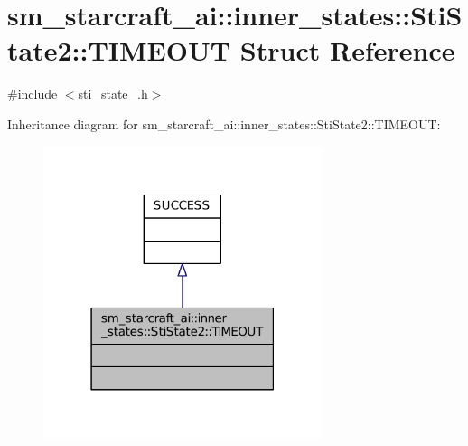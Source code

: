 \hypertarget{structsm__starcraft__ai_1_1inner__states_1_1StiState2_1_1TIMEOUT}{}\section{sm\+\_\+starcraft\+\_\+ai\+:\+:inner\+\_\+states\+:\+:Sti\+State2\+:\+:T\+I\+M\+E\+O\+UT Struct Reference}
\label{structsm__starcraft__ai_1_1inner__states_1_1StiState2_1_1TIMEOUT}


{\ttfamily \#include $<$sti\+\_\+state\+\_.\+h$>$}



Inheritance diagram for sm\+\_\+starcraft\+\_\+ai\+:\+:inner\+\_\+states\+:\+:Sti\+State2\+:\+:T\+I\+M\+E\+O\+UT\+:
\nopagebreak
\begin{figure}[H]
\begin{center}
\leavevmode
\includegraphics[width=231pt]{structsm__starcraft__ai_1_1inner__states_1_1StiState2_1_1TIMEOUT__inherit__graph}
\end{center}
\end{figure}


